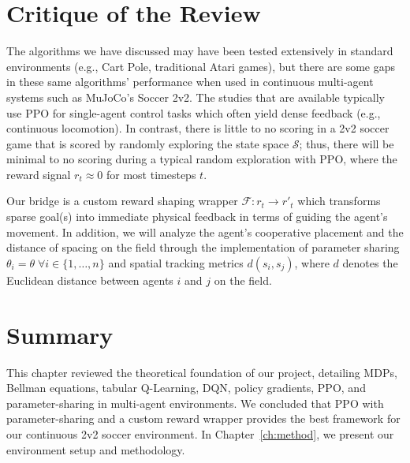 \section{Critique of the Review}
\label{sec:lit_critique}

The algorithms we have discussed may have been tested extensively in standard environments (e.g., Cart Pole, traditional Atari games), but there are some gaps in these same algorithms' performance when used in continuous multi-agent systems such as MuJoCo's Soccer 2v2. The studies that are available typically use PPO for single-agent control tasks which often yield dense feedback (e.g., continuous locomotion). In contrast, there is little to no scoring in a 2v2 soccer game that is scored by randomly exploring the state space $\mathcal{S}$; thus, there will be minimal to no scoring during a typical random exploration with PPO, where the reward signal $r_t \approx 0$ for most timesteps $t$.

Our bridge is a custom reward shaping wrapper $\mathcal{F}: r_t \rightarrow r'_t$ which transforms sparse goal(s) into immediate physical feedback in terms of guiding the agent's movement. In addition, we will analyze the agent's cooperative placement and the distance of spacing on the field through the implementation of parameter sharing $\theta_i = \theta \; \forall i \in \{1, \dots, n\}$ and spatial tracking metrics $d(s_i, s_j)$, where $d$ denotes the Euclidean distance between agents $i$ and $j$ on the field.

\section{Summary}
\label{sec:lit_summary}

This chapter reviewed the theoretical foundation of our project, detailing MDPs, Bellman equations, tabular Q-Learning, DQN, policy gradients, PPO, and parameter-sharing in multi-agent environments. We concluded that PPO with parameter-sharing and a custom reward wrapper provides the best framework for our continuous 2v2 soccer environment. In Chapter~\ref{ch:method}, we present our environment setup and methodology.